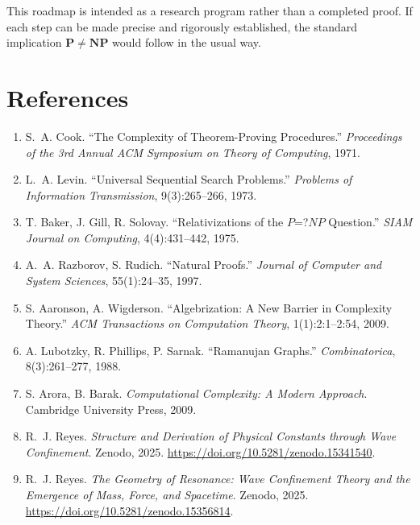 \documentclass[12pt]{article}
\theoremstyle{remark}
\begin{document}
This roadmap is intended as a research program rather than a completed proof. If each step can be made precise and rigorously established, the standard implication \( \mathbf{P} \neq \mathbf{NP} \) would follow in the usual way.
\clearpage
\section*{References}

\begin{enumerate}

  \item S.~A. Cook.
  ``The Complexity of Theorem-Proving Procedures.''
  \textit{Proceedings of the 3rd Annual ACM Symposium on Theory of Computing}, 1971.

  \item L.~A. Levin.
  ``Universal Sequential Search Problems.''
  \textit{Problems of Information Transmission}, 9(3):265--266, 1973.

  \item T. Baker, J. Gill, R. Solovay.
  ``Relativizations of the $P$=?$NP$ Question.''
  \textit{SIAM Journal on Computing}, 4(4):431--442, 1975.

  \item A.~A. Razborov, S. Rudich.
  ``Natural Proofs.''
  \textit{Journal of Computer and System Sciences}, 55(1):24--35, 1997.

  \item S. Aaronson, A. Wigderson.
  ``Algebrization: A New Barrier in Complexity Theory.''
  \textit{ACM Transactions on Computation Theory}, 1(1):2:1--2:54, 2009.

  \item A. Lubotzky, R. Phillips, P. Sarnak.
  ``Ramanujan Graphs.''
  \textit{Combinatorica}, 8(3):261--277, 1988.

  \item S. Arora, B. Barak.
  \textit{Computational Complexity: A Modern Approach}.
  Cambridge University Press, 2009.

  \item R.~J. Reyes.
  \textit{Structure and Derivation of Physical Constants through Wave Confinement}.
  Zenodo, 2025. \url{https://doi.org/10.5281/zenodo.15341540}.

  \item R.~J. Reyes.
  \textit{The Geometry of Resonance: Wave Confinement Theory and the Emergence of Mass, Force, and Spacetime}.
  Zenodo, 2025. \url{https://doi.org/10.5281/zenodo.15356814}.

\end{enumerate}
\end{document}
